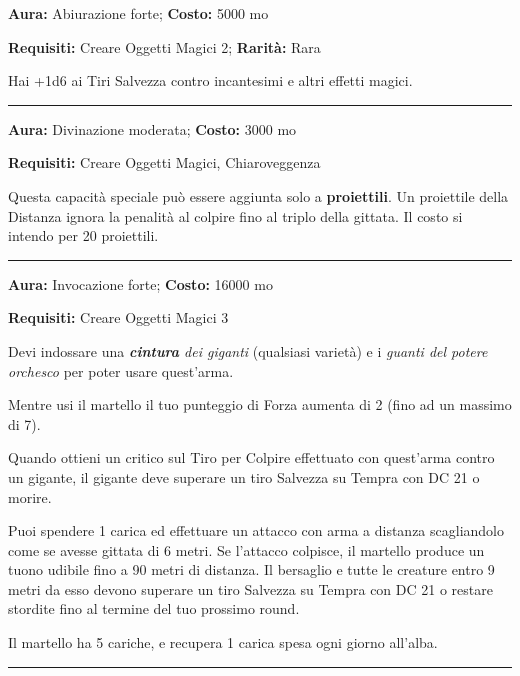 \begin{multicols}{2}
\textbf{Aura:} Abiurazione forte; \textbf{Costo:} 5000 mo

\textbf{Requisiti:} Creare Oggetti Magici 2; \textbf{Rarità:} Rara

Hai +1d6 ai Tiri Salvezza contro incantesimi e altri effetti magici.

\smallskip\noindent\rule{\linewidth}{2pt}  \hypertarget{Distanza}{}\medskip{}\noindent\label{Distanza}

\textbf{Aura:} Divinazione moderata; \textbf{Costo:} 3000 mo

\textbf{Requisiti:} Creare Oggetti Magici, Chiaroveggenza

Questa capacità speciale può essere aggiunta solo a \textbf{proiettili}. Un proiettile della Distanza ignora la penalità al colpire fino al triplo della gittata. Il costo si intendo per 20 proiettili.

\smallskip\noindent\rule{\linewidth}{2pt}  \hypertarget{DistruttricedeiGiganti}{}\medskip{}\noindent\label{DistruttricedeiGiganti}

\textbf{Aura:} Invocazione forte; \textbf{Costo:} 16000 mo

\textbf{Requisiti:} Creare Oggetti Magici 3



Devi indossare una \emph{\textbf{cintura} dei giganti} (qualsiasi varietà) e i \emph{guanti del potere orchesco} per poter usare quest'arma.

Mentre usi il martello il tuo punteggio di Forza aumenta di 2 (fino ad un massimo di 7).

Quando ottieni un critico sul Tiro per Colpire effettuato con quest'arma contro un gigante, il gigante deve superare un tiro Salvezza su Tempra con DC 21 o morire.

Puoi spendere 1 carica ed effettuare un attacco con arma a distanza scagliandolo come se avesse gittata di 6 metri. Se l'attacco colpisce, il martello produce un tuono udibile fino a 90 metri di distanza. Il bersaglio e tutte le creature entro 9 metri da esso devono superare un tiro Salvezza su Tempra con DC 21 o restare stordite fino al termine del tuo prossimo round.

Il martello ha 5 cariche, e recupera 1 carica spesa ogni giorno all'alba.

\smallskip\noindent\rule{\linewidth}{2pt}  \hypertarget{Distruzione}{}\medskip{}\noindent\label{Distruzione}


\end{multicols}
